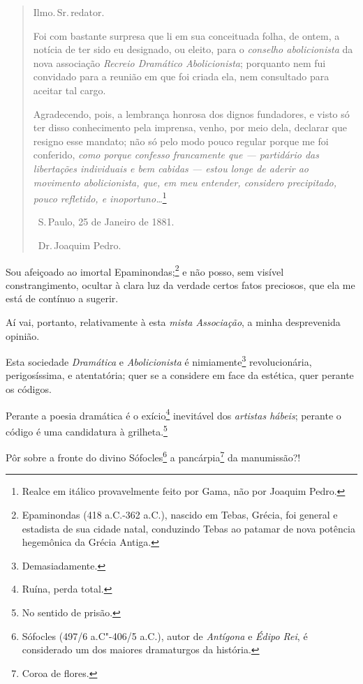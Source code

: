 \asterisc

\begin{quote}
Ilmo.\,Sr.\,redator.

Foi com bastante surpresa que li em sua conceituada folha, de ontem, a
notícia de ter sido eu designado, ou eleito, para o \emph{conselho
abolicionista} da nova associação \emph{Recreio Dramático
Abolicionista}; porquanto nem fui convidado para a reunião em que foi
criada ela, nem consultado para aceitar tal cargo.

Agradecendo, pois, a lembrança honrosa dos dignos fundadores, e visto só
ter disso conhecimento pela imprensa, venho, por meio dela, declarar que
resigno esse mandato; não só pelo modo pouco regular porque me foi
conferido, \emph{como porque confesso francamente que --- partidário
das libertações individuais e bem cabidas --- estou longe de aderir ao
movimento abolicionista, que, em meu entender, considero precipitado,
pouco refletido, e inoportuno\ldots{}}\footnote{Realce em itálico
  provavelmente feito por Gama, não por Joaquim Pedro.}

\hfill\ S.\,Paulo, 25 de Janeiro de 1881.

\hfill\ Dr.\,Joaquim Pedro.
\end{quote}

Sou afeiçoado ao imortal Epaminondas;\footnote{Epaminondas (418
  a.C.-362 a.C.), nascido em Tebas, Grécia, foi general e estadista de
  sua cidade natal, conduzindo Tebas ao patamar de nova
  potência hegemônica da Grécia Antiga.} e não posso, sem visível
constrangimento, ocultar à clara luz da verdade certos fatos preciosos,
que ela me está de contínuo a sugerir.

Aí vai, portanto, relativamente à esta \emph{mista Associação}, a minha
desprevenida opinião.

Esta sociedade \emph{Dramática} e \emph{Abolicionista} é
nimiamente\footnote{Demasiadamente.} revolucionária, perigosíssima, e
atentatória; quer se a considere em face da estética, quer perante os
códigos.

Perante a poesia dramática é o exício\footnote{Ruína, perda total.}
inevitável dos \emph{artistas hábeis}; perante o código é uma
candidatura à grilheta.\footnote{No sentido de prisão.}

Pôr sobre a fronte do divino Sófocles\footnote{Sófocles (497/6
  a.C"-406/5 a.C.), autor de \emph{Antígona} e \emph{Édipo Rei}, é
  considerado um dos maiores dramaturgos da história.} a
pancárpia\footnote{Coroa de flores.} da manumissão?!

